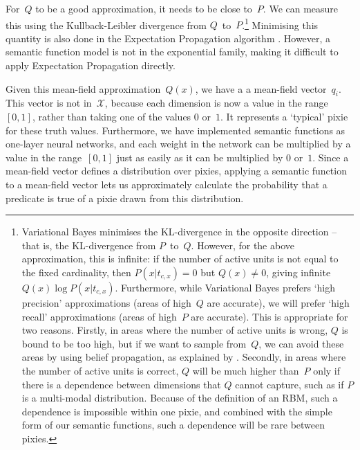 \documentclass[11pt]{article}
\begin{document}
For~$Q$ to be a good approximation, it needs to be close to~$P$.
We can measure this using the Kullback-Leibler divergence from $Q$~to~$P$.\footnote{%
	Variational Bayes minimises the KL-divergence in the opposite direction
	-- that is, the KL-divergence from $P$~to~$Q$.
	However, for the above approximation, this is infinite:
	if the number of active units is not equal to the fixed cardinality,
	then $P(x|t_{c,x})=0$ but $Q(x) \neq 0$,
	giving infinite $Q(x)\log P(x|t_{c,x})$.
	Furthermore, while Variational Bayes prefers `high precision' approximations
	(areas of high~$Q$ are accurate),
	we will prefer `high recall' approximations
	(areas of high~$P$ are accurate).
	This is appropriate for two reasons.
	Firstly, in areas where the number of active units is wrong,
	$Q$ is bound to be too high, but if we want to sample from~$Q$,
	we can avoid these areas by using belief propagation,
	as explained by .
	Secondly, in areas where the number of active units is correct,
	$Q$ will be much higher than~$P$ only if there is a dependence between dimensions that $Q$ cannot capture,
	such as if $P$ is a multi-modal distribution.
	Because of the definition of an RBM, such a dependence is impossible within one pixie,
	and combined with the simple form of our semantic functions,
	such a dependence will be rare between pixies.
}
Minimising this quantity is also done in the Expectation Propagation algorithm \cite{minka2001expectation}.
However, a semantic function model is not in the exponential family,
making it difficult to apply Expectation Propagation directly.

Given this mean-field approximation~$Q(x)$,
we have a a mean-field vector~$q_i$.
This vector is not in~$\mathcal{X}$,
because each dimension is now a value in the range~$[0,1]$,
rather than taking one of the values $0$ or~$1$.
It represents a `typical' pixie for these truth values.
Furthermore, we have implemented semantic functions as one-layer neural networks,
and each weight in the network can be multiplied by a value in the range~$[0,1]$
just as easily as it can be multiplied by $0$ or~$1$.
Since a mean-field vector defines a distribution over pixies,
applying a semantic function to a mean-field vector
lets us approximately calculate the probability that
a predicate is true of a pixie drawn from this distribution.
\end{document}
